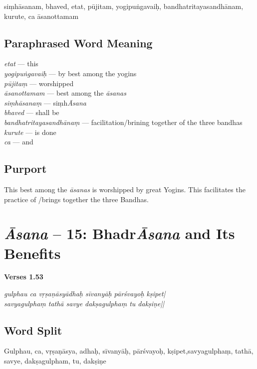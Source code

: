siṃhāsanam,  bhaved, etat, pūjitam, yogipuṅgavaiḥ, bandhatritayasandhānam, kurute, ca āsanottamam

\subsection*{Paraphrased Word Meaning}

\begin{multicols}{2}
\textit{etat} ---  this \\
\textit{yogipuṅgavaiḥ} --- by best among the yogins   \\
\textit{pūjitaṃ} ---  worshipped  \\
\textit{āsanottamam} --- best among the \textit{āsanas} \\
\textit{siṃhāsanaṃ} ---  siṃh\textit{Āsana} \\
\textit{bhaved} ---   shall be   \\
\textit{bandhatritayasandhānaṃ} --- facilitation/brining together of the three bandhas   \\
\textit{kurute} ---  is done  \\
\textit{ca} --- and
\end{multicols}

\subsection*{Purport}

This best among the \textit{āsanas} is worshipped by great Yogins. This facilitates the practice of /brings together the three Bandhas.
\newpage

\section*{\textit{Āsana} -- 15: Bhadr\textit{Āsana} and Its Benefits}

\noindent \textbf{Verses 1.53}

\begin{shloka}
\textit{gulphau ca vṛṣaṇāsyādhaḥ sīvanyāḥ pārśvayoḥ kṣipet|}\\
\textit{savyagulphaṃ tathā savye dakṣagulphaṃ tu dakṣiṇe||}
\end{shloka}

\subsection*{Word Split}

Gulphau, ca, vṛṣaṇāsya, adhaḥ, sīvanyāḥ, pārśvayoḥ, kṣipet,savyagulphaṃ, tathā, savye, dakṣagulpham, tu, dakṣiṇe

